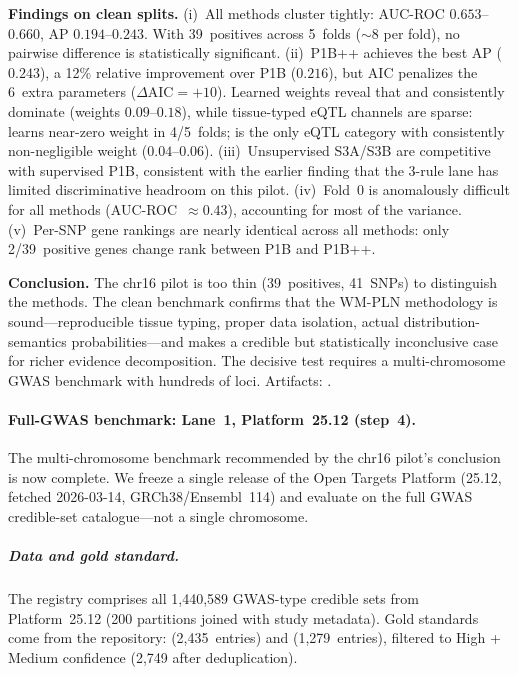 \documentclass[11pt,openany]{report}
\begin{document}
\medskip\noindent
\textbf{Findings on clean splits.}
(i)~All methods cluster tightly: AUC-ROC $0.653$--$0.660$,
AP $0.194$--$0.243$.
With 39~positives across 5~folds ($\sim\!8$ per fold), no pairwise
difference is statistically significant.
(ii)~P1B++ achieves the best AP ($0.243$), a 12\% relative improvement
over P1B ($0.216$), but AIC penalizes the 6~extra parameters
($\Delta\text{AIC}=+10$).
Learned weights reveal that  and
 consistently dominate (weights $0.09$--$0.18$),
while tissue-typed eQTL channels are sparse:
 learns near-zero weight in 4/5~folds;
 is the only eQTL category with consistently
non-negligible weight ($0.04$--$0.06$).
(iii)~Unsupervised S3A/S3B are competitive with supervised P1B, consistent
with the earlier finding that the 3-rule lane has limited discriminative
headroom on this pilot.
(iv)~Fold~0 is anomalously difficult for all methods
(AUC-ROC~$\approx 0.43$), accounting for most of the variance.
(v)~Per-SNP gene rankings are nearly identical across all methods:
only 2/39~positive genes change rank between P1B and P1B++.

\medskip\noindent
\textbf{Conclusion.}
The chr16 pilot is too thin (39~positives, 41~SNPs) to distinguish the
methods.  The clean benchmark confirms that the WM-PLN methodology is
sound---reproducible tissue typing, proper data isolation, actual
distribution-semantics probabilities---and makes a credible but
statistically inconclusive case for richer evidence decomposition.
The decisive test requires a multi-chromosome GWAS benchmark with
hundreds of loci.
Artifacts: .

\paragraph{Full-GWAS benchmark: Lane~1, Platform~25.12 (step~4).}
The multi-chromosome benchmark recommended by the chr16 pilot's
conclusion is now complete.  We freeze a single release of the
Open Targets Platform (25.12, fetched 2026-03-14, GRCh38/Ensembl~114)
and evaluate on the full GWAS credible-set catalogue---not a single
chromosome.

\subparagraph{Data and gold standard.}
The registry comprises all 1,440,589 GWAS-type credible sets from
Platform~25.12 (200 partitions joined with study metadata).
Gold standards come from the 
repository:  (2,435~entries)
and  (1,279~entries), filtered to
High + Medium confidence (2,749 after deduplication).
\end{document}
